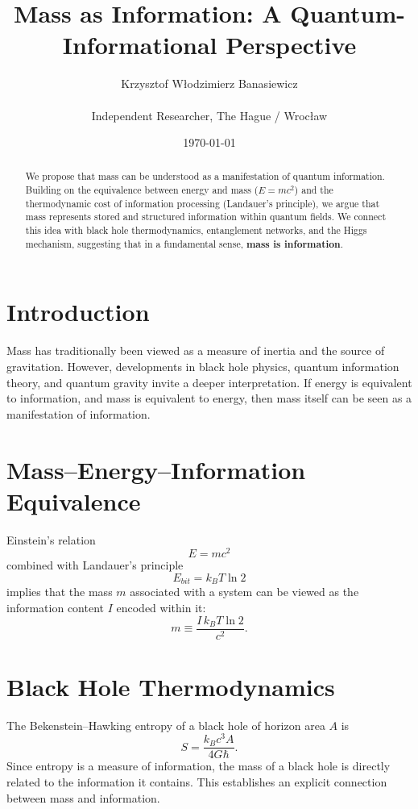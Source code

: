 \documentclass[12pt]{article}
\title{Mass as Information: A Quantum-Informational Perspective}
\author{Krzysztof W\l{}odzimierz Banasiewicz \\\\ Independent Researcher, The Hague / Wroc\l{}aw}
\date{\today}
\begin{document}
\maketitle

\begin{abstract}
We propose that mass can be understood as a manifestation of quantum information.
Building on the equivalence between energy and mass ($E=mc^2$) and the thermodynamic cost
of information processing (Landauer's principle), we argue that mass represents stored
and structured information within quantum fields. We connect this idea with black hole
thermodynamics, entanglement networks, and the Higgs mechanism, suggesting that
in a fundamental sense, \textbf{mass is information}.
\end{abstract}

\section{Introduction}
Mass has traditionally been viewed as a measure of inertia and the source of gravitation.
However, developments in black hole physics, quantum information theory, and quantum gravity
invite a deeper interpretation. If energy is equivalent to information, and mass is equivalent to energy,
then mass itself can be seen as a manifestation of information.

\section{Mass--Energy--Information Equivalence}
Einstein's relation
\begin{equation}
E = mc^2
\end{equation}
combined with Landauer's principle
\begin{equation}
E_{bit} = k_B T \ln 2
\end{equation}
implies that the mass $m$ associated with a system can be viewed as the information content $I$
encoded within it:
\begin{equation}
m \equiv \frac{I \, k_B T \ln 2}{c^2}.
\end{equation}

\section{Black Hole Thermodynamics}
The Bekenstein--Hawking entropy of a black hole of horizon area $A$ is
\begin{equation}
S = \frac{k_B c^3 A}{4 G \hbar}.
\end{equation}
Since entropy is a measure of information, the mass of a black hole is
directly related to the information it contains.
This establishes an explicit connection between mass and information.
\end{document}
